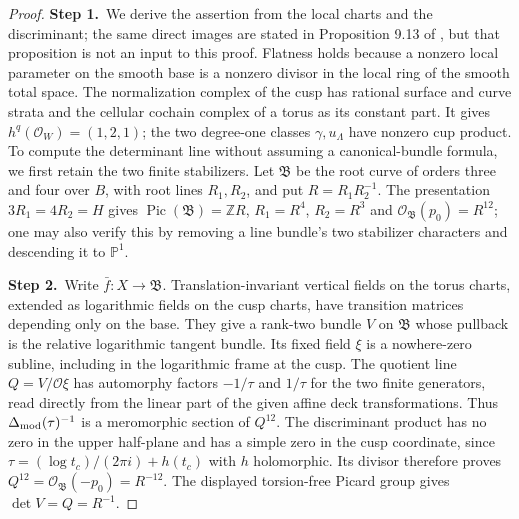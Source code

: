 \begin{proof}
\par\smallskip\noindent\textbf{Step 1.}\ We derive the assertion from the local charts and the discriminant;
the same direct images are stated in Proposition 9.13 of
\cite{AC26}, but that proposition is not an input to this proof.
Flatness holds
because a nonzero local parameter on the smooth base is a nonzero divisor
in the local ring of the smooth total space.  The normalization complex
of the cusp has rational surface and curve strata and the cellular
cochain complex of a torus as its constant part.  It gives
$h^q(\mathcal O_W)=(1,2,1)$; the two degree-one classes $\gamma,u_{\Lambda}$ have nonzero
cup product.  To compute the determinant line without assuming a
canonical-bundle formula, we first retain the two finite stabilizers.
Let $\mathfrak B$ be the root curve of orders three and four over $B$,
with root lines $R_1,R_2$, and put $R=R_1R_2^{-1}$.  The presentation
$3R_1=4R_2=H$ gives $\operatorname{Pic}(\mathfrak B)=\mathbb Z R$,
$R_1=R^4$, $R_2=R^3$ and $\mathcal O_{\mathfrak B}(p_0)=R^{12}$;
one may also verify this by removing a line bundle's two stabilizer
characters and descending it to $\mathbb P^1$.

\par\smallskip\noindent\textbf{Step 2.}\ Write $\bar f:X\to\mathfrak B$.  Translation-invariant vertical
fields on the torus charts, extended as logarithmic fields on the cusp
charts, have transition matrices depending only on the base.  They
give a rank-two bundle $V$ on $\mathfrak B$ whose pullback is the
relative logarithmic tangent bundle.  Its fixed field $\xi$ is a
nowhere-zero subline, including in the logarithmic frame at the cusp.
The quotient line $Q=V/\mathcal O\xi$ has automorphy factors $-1/\tau$
and $1/\tau$ for the two finite generators, read directly from the
linear part of the given affine deck transformations.  Thus
$\Delta_{\rm mod}(\tau)^{-1}$ is a meromorphic section of $Q^{12}$.
The discriminant product has no zero in the upper half-plane and
has a simple zero in the cusp coordinate, since
$\tau=(\log t_c)/(2\pi i)+h(t_c)$ with $h$ holomorphic.  Its divisor
therefore proves $Q^{12}=\mathcal O_{\mathfrak B}(-p_0)=R^{-12}$.
The displayed torsion-free Picard group gives
$\det V=Q=R^{-1}$.


\end{proof}
